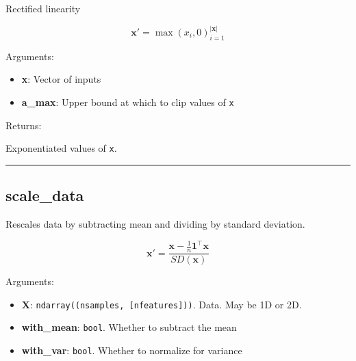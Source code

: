 \begin{Shaded}
\begin{Highlighting}[]
\OperatorTok{=}\NormalTok{)}
\end{Highlighting}
\end{Shaded}

Rectified linearity

\[
\mathbf x' = \max (x_i, 0)_{i=1}^{|\mathbf x|}
\]

Arguments:

\begin{itemize}
\tightlist
\item
  \textbf{x}: Vector of inputs
\item
  \textbf{a\_max}: Upper bound at which to clip values of \texttt{x}
\end{itemize}

Returns:

Exponentiated values of \texttt{x}.

\begin{center}\rule{0.5\linewidth}{\linethickness}\end{center}

\subsection{scale\_data}\label{scale_data}

\begin{Shaded}
\begin{Highlighting}[]
\OperatorTok{=}\OperatorTok{=}\OperatorTok{=}\NormalTok{)}
\end{Highlighting}
\end{Shaded}

Rescales data by subtracting mean and dividing by standard deviation.

\[
\mathbf x' = \frac{\mathbf x - \frac{1}{n} \mathbf 1^\top \mathbf x}{SD(\mathbf x)}
\]

Arguments:

\begin{itemize}
\tightlist
\item
  \textbf{X}: \texttt{ndarray((nsamples,\ {[}nfeatures{]}))}. Data. May
  be 1D or 2D.
\item
  \textbf{with\_mean}: \texttt{bool}. Whether to subtract the mean
\item
  \textbf{with\_var}: \texttt{bool}. Whether to normalize for variance
\end{itemize}

